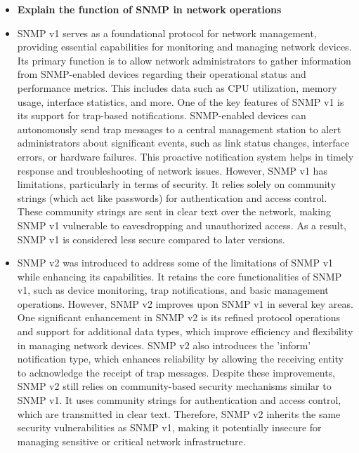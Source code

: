 \documentclass{article}
\begin{document}
\begin{itemize}
  \item \textbf{Explain the function of SNMP in network operations}
  	\item[] SNMP v1 serves as a foundational protocol for network management, providing essential capabilities for monitoring and managing network devices. Its primary function is to allow network administrators to gather information from SNMP-enabled devices regarding their operational status and performance metrics. This includes data such as CPU utilization, memory usage, interface statistics, and more. One of the key features of SNMP v1 is its support for trap-based notifications. SNMP-enabled devices can autonomously send trap messages to a central management station to alert administrators about significant events, such as link status changes, interface errors, or hardware failures. This proactive notification system helps in timely response and troubleshooting of network issues. However, SNMP v1 has limitations, particularly in terms of security. It relies solely on community strings (which act like passwords) for authentication and access control. These community strings are sent in clear text over the network, making SNMP v1 vulnerable to eavesdropping and unauthorized access. As a result, SNMP v1 is considered less secure compared to later versions.
	\item[] SNMP v2 was introduced to address some of the limitations of SNMP v1 while enhancing its capabilities. It retains the core functionalities of SNMP v1, such as device monitoring, trap notifications, and basic management operations. However, SNMP v2 improves upon SNMP v1 in several key areas. One significant enhancement in SNMP v2 is its refined protocol operations and support for additional data types, which improve efficiency and flexibility in managing network devices. SNMP v2 also introduces the 'inform' notification type, which enhances reliability by allowing the receiving entity to acknowledge the receipt of trap messages. Despite these improvements, SNMP v2 still relies on community-based security mechanisms similar to SNMP v1. It uses community strings for authentication and access control, which are transmitted in clear text. Therefore, SNMP v2 inherits the same security vulnerabilities as SNMP v1, making it potentially insecure for managing sensitive or critical network infrastructure.

\end{itemize}
\end{document}
